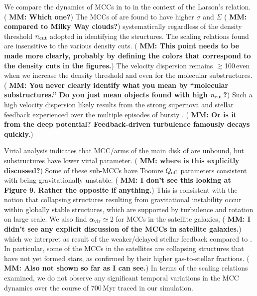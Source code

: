 \IfFileExists{emulateapjlegacy.cls}{\documentclass[iop]{emulateapjlegacy}}{\documentclass[iop]{emulateapj}}
\newcommand{\MM}[1]{({\bf \color{mmcolor} MM: #1})}
\begin{document}
We compare the dynamics of MCCs in \flower to \obs in the context of
the Larson's relation. \MM{Which one?}
The MCCs of \flower are found to have higher $\sigma$ and $\Sigma$
\MM{compared to Milky Way clouds?}
systematically regardless of the 
density threshold $n_{\rm cut}$ adopted in identifying the structures.
The scaling relations found are insensitive to the various density
cuts.  \MM{This point needs to be made more clearly, probably by
  defining the colors that correspond to the density cuts in the figures.}
 The velocity dispersion remains $\gtrsim$100\,\kms even when we increase the density threshold and 
 even for the molecular substructures.  \MM{You never clearly identify
   what you mean by ``molecular substructures.''  Do you just mean
   objects found with high $n_{\rm cut}$?}
 Such a high velocity dispersion likely results from the strong supernova and stellar feedback \flower experienced 
 over the multiple episodes of bursty \SF.   \MM{Or is it from the
   deep potential?  Feedback-driven turbulence famously decays quickly.}

Virial analysis indicates that MCC/arms of the main disk of \flower are unbound, but substructures have
lower virial parameter.
\MM{where is this explicitly discussed?}
 Some of these sub-MCCs have Toomre $Q_{\rm eff}$ parameters consistent with being
gravitationally unstable.  \MM{I don't see this looking at Figure 9.
  Rather the opposite if anything.} This is consistent with the notion that collapsing structures resulting from
gravitational instability occur within globally stable structures, which are
supported by turbulence and rotation on large scale.
We also find $\alpha_{\rm vir}\simeq$\,2 for MCCs in the satellite
galaxies, \MM{I didn't see any explicit discussion of the MCCs in
  satellite galaxies.} which we interpret as
result of the weaker/delayed stellar feedback compared to \flower. 
In particular, some of the MCCs in the satellites are collapsing structures that have not yet formed stars, as confirmed by their
higher gas-to-stellar fractions. \MM{Also not shown so far as I can see.}
In terms of the scaling relations examined, we do not observe any significant
temporal variations in the MCC dynamics over the course of 700\,Myr
traced in our simulation. 
\end{document}
